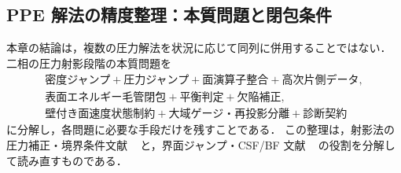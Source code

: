 %
\subsection{PPE 解法の精度整理：本質問題と閉包条件}
\label{sec:pressure_accuracy_summary}

本章の結論は，複数の圧力解法を状況に応じて同列に併用することではない．
二相の圧力射影段階の本質問題を
\[
\begin{gathered}
  \text{密度ジャンプ}
  +\text{圧力ジャンプ}
  +\text{面演算子整合}
  +\text{高次片側データ},\\
  \text{表面エネルギー毛管閉包}
  +\text{平衡判定}
  +\text{欠陥補正},\\
  \text{壁付き面速度状態制約}
  +\text{大域ゲージ・再投影分離}
  +\text{診断契約}
\end{gathered}
\]
に分解し，各問題に必要な手段だけを残すことである．
この整理は，射影法の圧力補正・境界条件文献
~\cite{Chorin1968,vanKan1986,BrownCortezMinion2001,Guermond2006,PyoShen2007}
と，界面ジャンプ・CSF/BF 文献
~\cite{Brackbill1992,Fedkiw1999,Kang2000,Francois2006,Popinet2009}
の役割を分解して読み直すものである．

